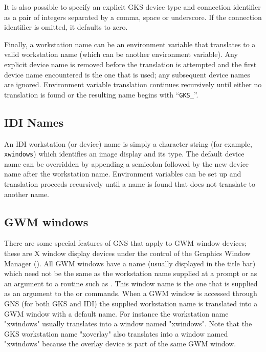 \documentclass[twoside,11pt,nolof]{starlink}
\begin{document}
It is also possible to specify an explicit GKS device type and connection
identifier as a pair of integers separated by a comma, space or underscore. If
the connection identifier is omitted, it defaults to zero.

Finally, a workstation name can be an environment
variable that translates to a valid workstation name (which can be another
environment variable). Any explicit device
name is removed before the translation is attempted and the first device name
encountered is the one that is used; any subsequent device names are ignored.
Environment variable translation continues recursively until either no
translation is found or the resulting name begins with ``{\tt{GKS\_}}''.

\subsection{IDI Names}

An IDI workstation (or device) name is simply a character string (for example,
\texttt{xwindows}) which identifies an image display and its type. The default
device name can be overridden by appending a semicolon followed by the new
device name after the workstation name.
Environment variables can be set up and
translation proceeds recursively until a name is found that does not
translate to another name.

\subsection{GWM windows}

There are some special features of GNS that apply to GWM window devices;
these are X window display devices under the control of the Graphics
Window Manager ().
All GWM windows have a name (usually displayed in the title
bar) which need not be the same as the workstation name supplied at a prompt
or as an argument to a routine such as
. This window name is the one
that is supplied as an argument to the
 or
 commands. When a
GWM window is accessed through GNS (for both GKS and IDI) the supplied
workstation name is translated into a GWM window with a default name. For
instance the workstation name "xwindows" usually translates into a window
named "xwindows". Note that the GKS workstation name "xoverlay" also
translates into a window named "xwindows" because the overlay device is part
of the same GWM window.
\end{document}

